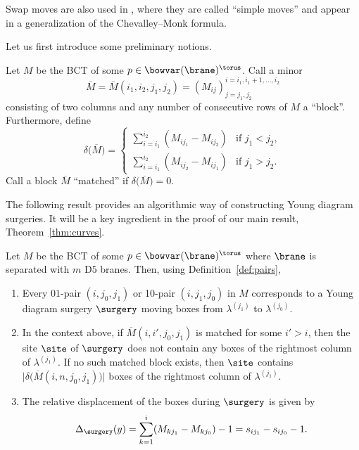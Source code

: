 \begin{Remark}
Swap moves are also used in {\rm\cite{W}}, where they are called ``simple moves'' and appear in a generalization of the Chevalley--Monk formula.
\end{Remark}

Let us first introduce some preliminary notions.

\begin{Definition} \label{def:blocks}
Let $M$ be the BCT of some $p\in\bowvar(\brane)^\torus$. Call a minor
\[
\overline M = \overline{M}(i_1, i_2, j_1, j_2) = \left(M_{ij}\right)^{i = i_1, i_1+1, \dots , i_2}_{j = j_1, j_2}
\]
consisting of two columns and any number of consecutive rows of $M$ a ``block''. Furthermore, define
\[
\delta\bigl(\overline M\bigr) = \begin{cases}
\displaystyle\sum_{i = i_1}^{i_2} (M_{i j_1} - M_{i j_2}) & \text{if }j_1 < j_2, \\
\displaystyle\sum_{i = i_1}^{i_2} (M_{i j_2} - M_{i j_1}) & \text{if }j_1 > j_2.
\end{cases}
\]
Call a block $\overline M$ ``matched'' if $\delta\bigl(\overline M\bigr) = 0$.
\end{Definition}

The following result provides an algorithmic way of constructing Young diagram surgeries. It will be a key ingredient in the proof of our main result, Theorem~\ref{thm:curves}.

\begin{Proposition} \label{prop:BCT_curves}
Let $M$ be the BCT of some $p\in\bowvar(\brane)^\torus$ where $\brane$ is separated with $m$ D$5$ branes. Then, using Definition~{\rm\ref{def:pairs}},
\begin{enumerate}\itemsep=0pt
\item[$(1)$] Every $01$-pair $(i, j_0, j_1)$ or 10-pair $(i, j_1, j_0)$ in $M$ corresponds to a Young diagram surgery $\surgery$ moving boxes from $\lambda^{(j_1)}$ to $\lambda^{(j_0)}$.

\item[$(2)$] In the context above, if $\overline{M}(i, i', j_0, j_1)$ is matched for some $i' > i$, then the site $\site$ of $\surgery$ does not contain any boxes of the rightmost column of $\lambda^{(j_1)}$. If no such matched block exists, then $\site$ contains $\big|\delta\bigl(\overline{M}(i, n, j_0, j_1)\bigr)\big|$ boxes of the rightmost column of $\lambda^{(j_1)}$.

\item[$(3)$] The relative displacement of the boxes during $\surgery$ is given by
\[
\Delta_\surgery(y) = \sum_{k = 1}^{i} (M_{k j_1} - M_{k j_0}) - 1 = s_{i j_1} - s_{i j_0} - 1.
\]
\end{enumerate}
\end{Proposition}

